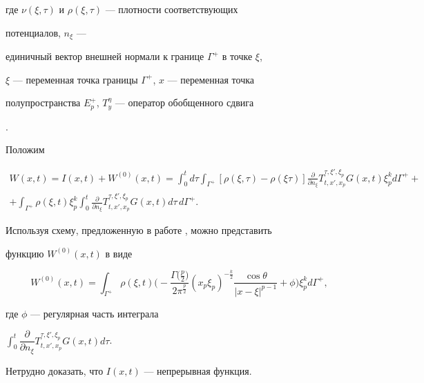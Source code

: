 где $\nu(\xi,\tau)$ и $\rho(\xi,\tau)$ --- плотности соответствующих 


потенциалов, $n_\xi$ --- 


единичный вектор внешней нормали к границе $\Gamma^+$ в точке $\xi$, 


$\xi$ --- переменная точка границы $\Gamma^+$, $x$ --- переменная точка 


полупространства $E^+_p$, $T^\eta_y$ --- оператор обобщенного сдвига 


\cite{3}. 


 


Положим 


\begin{multline*} 


W(x,t)=I(x,t)+W^{(0)}(x,t)=\int^t_0 d\tau\int_{\Gamma^+} 


[\rho(\xi,\tau)-\rho(\xi\tau)]\frac{\partial}{\partial n_\xi} 


T^{\tau,\xi',\xi_p}_{t,x',x_p}G(x,t)\xi^k_p d\Gamma^+ + \\ 


% 


+\int_{\Gamma^+}\rho(\xi,t)\xi^k_p\int^t_0 


\frac{\partial}{\partial n_\xi} 


T^{\tau,\xi',\xi_p}_{t,x',x_p}G(x,t)d\tau\,d\Gamma^+. 


\end{multline*} 


Используя схему, предложенную в работе \cite{4}, можно представить 


функцию $W^{(0)}(x,t)$ в виде 


$$ 


W^{(0)}(x,t)=\int_{\Gamma^+}\rho(\xi,t)\bigg( 


-\frac{\Gamma\big(\frac{p}{2}\big)}{2\pi^{\frac{p}{2}}} 


(x_p\xi_p)^{-\frac{k}{2}}\frac{\cos\theta} 


{|x-\xi|^{p-1}}+\phi\bigg)\xi^k_p d\Gamma^+, 


$$ 


где $\phi$ --- регулярная часть интеграла 


$\displaystyle\int^t_0\dfrac{\partial}{\partial n_\xi} 


T^{\tau,\xi',\xi_p}_{t,x',x_p}G(x,t)d\tau$. 


Нетрудно доказать, что $I(x,t)$ --- непрерывная функция. 


\bigskip 





